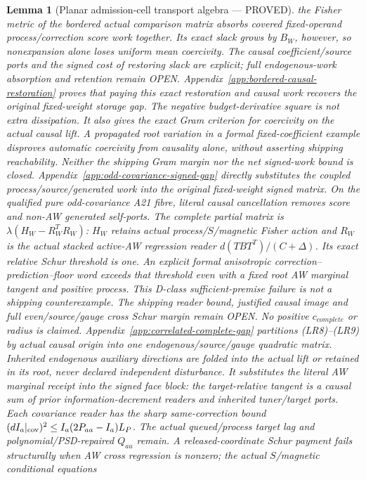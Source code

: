\documentclass[journal]{IEEEtran}
\newtheorem{lemma}{Lemma}\newtheorem{theorem}{Theorem}\newtheorem{proposition}{Proposition}\newtheorem{remark}{Remark}\newtheorem{corollary}{Corollary}
\begin{document}
\begin{lemma}[Planar admission-cell transport algebra --- PROVED]
the Fisher metric of the bordered actual comparison matrix absorbs covered
fixed-operand process/correction score work together. Its exact slack grows
by $B_W$, however, so nonexpansion alone loses uniform mean coercivity.
The causal coefficient/source ports and the signed cost of restoring slack
are explicit; full endogenous-work absorption and retention remain OPEN.
Appendix~\ref{app:bordered-causal-restoration} proves that paying this exact
restoration and causal work recovers the original fixed-weight storage gap.
The negative budget-derivative square is not extra dissipation. It also gives
the exact Gram criterion for coercivity on the actual causal lift. A propagated
root variation in a formal fixed-coefficient example disproves automatic
coercivity from causality alone, without asserting shipping reachability.
Neither the shipping Gram margin nor the net signed-work bound is closed.
Appendix~\ref{app:odd-covariance-signed-gap} directly substitutes the coupled
process/source/generated work into the original fixed-weight signed matrix.
On the qualified pure odd-covariance A21 fibre, literal causal cancellation
removes score and non-AW generated self-ports. The complete partial matrix is
$\lambda(H_W-R_W^TR_W)$: $H_W$ retains actual process/$S$/magnetic Fisher
action and $R_W$ is the actual stacked active-AW regression reader
$d(TBT^T)/(C+\Delta)$. Its exact relative Schur threshold is one.
An explicit formal anisotropic correction--prediction--floor word exceeds
that threshold even with a fixed root AW marginal tangent and positive process.
This D-class sufficient-premise failure is not a shipping counterexample.
The shipping reader bound, justified causal image and full even/source/gauge
cross Schur margin remain OPEN. No positive $c_{complete}$ or radius is claimed.
Appendix~\ref{app:correlated-complete-gap} partitions (LR8)--(LR9) by
actual causal origin into one endogenous/source/gauge quadratic matrix.
Inherited endogenous auxiliary directions are folded into the actual lift
or retained in its root, never declared independent disturbance.
It substitutes the literal AW marginal receipt into the signed face block:
the target-relative tangent is a causal sum of prior information-decrement
readers and inherited tuner/target ports. Each covariance reader has the
sharp same-correction bound
$(dI_a|_{\rm cov})^2\le I_a(2P_{aa}-I_a)L_P$.
The actual queued/process target lag and polynomial/PSD-repaired $Q_{aa}$
remain. A released-coordinate Schur payment fails structurally when AW
cross regression is nonzero; the actual $S$/magnetic conditional equations

\end{lemma}
\end{document}
